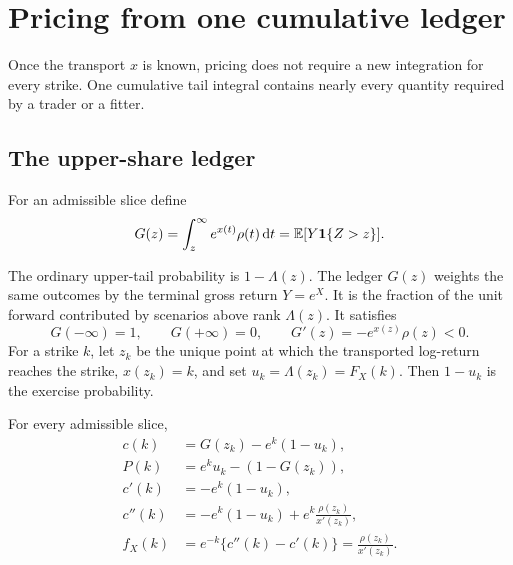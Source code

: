 \section{Pricing from one cumulative ledger}
\label{sec:ledger}

Once the transport $x$ is known, pricing does not require a new integration
for every strike.  One cumulative tail integral contains nearly every
quantity required by a trader or a fitter.

\subsection{The upper-share ledger}

\begin{definition}
\label{def:ledger}
For an admissible slice define
\begin{equation}
G(z)=\int_z^\infty e^{x(t)}\rho(t)\,\mathrm{d} t
=\mathbb{E}[Y\mathbf{1}\{Z>z\}].
\label{eq:ledger}
\end{equation}
\end{definition}

The ordinary upper-tail probability is $1-\Lambda(z)$.  The ledger $G(z)$
weights the same outcomes by the terminal gross return $Y=e^X$.  It is the
fraction of the unit forward contributed by scenarios above rank
$\Lambda(z)$.  It satisfies
\begin{equation}
G(-\infty)=1,\qquad G(+\infty)=0,
\qquad G'(z)=-e^{x(z)}\rho(z)<0.
\label{eq:ledgerprops}
\end{equation}
For a strike $k$, let $z_k$ be the unique point at which the transported
log-return reaches the strike, $x(z_k)=k$, and set
$u_k=\Lambda(z_k)=F_X(k)$.  Then $1-u_k$ is the exercise probability.

\begin{proposition}
\label{prop:pricing}
For every admissible slice,
\begin{align}
c(k)&=G(z_k)-e^k(1-u_k),
\label{eq:call}\\
P(k)&=e^ku_k-(1-G(z_k)),
\label{eq:put}\\
c'(k)&=-e^k(1-u_k),
\label{eq:cprime}\\
c''(k)&=-e^k(1-u_k)+e^k\frac{\rho(z_k)}{x'(z_k)},
\label{eq:csecond}\\
f_X(k)&=e^{-k}\{c''(k)-c'(k)\}
=\frac{\rho(z_k)}{x'(z_k)}.
\label{eq:bl_division}
\end{align}
\end{proposition}

